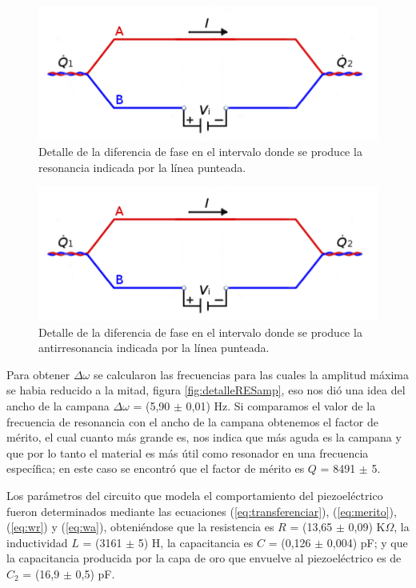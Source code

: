 \documentclass[twoside,twocolumn,a4paper]{article}
\begin{document}
\begin{figure}[H]
\includegraphics[width=\linewidth]{peltier.jpg}
\caption{Detalle de la diferencia de fase en el intervalo donde se produce la resonancia indicada por la l\'inea punteada.}
\label{fig:bajada}
\end{figure}

\begin{figure}[H]
\includegraphics[width=\linewidth]{peltier.jpg}
\caption{Detalle de la diferencia de fase en el intervalo donde se produce la antirresonancia indicada por la l\'inea punteada.}
\label{fig:subida}
\end{figure}

Para obtener $\Delta \omega$ se calcularon las frecuencias para las cuales la amplitud m\'axima se habia reducido a la mitad, figura \ref{fig:detalleRESamp}, eso nos di\'o una idea del ancho de la campana $\Delta \omega$ = (5,90 $\pm$ 0,01) Hz. Si comparamos el valor de la frecuencia de resonancia con el ancho de la campana obtenemos el factor de m\'erito, el cual cuanto m\'as grande es, nos indica que m\'as aguda es la campana y que por lo tanto el material es m\'as \'util como resonador en una frecuencia espec\'ifica; en este caso se encontr\'o que el factor de m\'erito es $Q$ = 8491 $\pm$ 5.

Los par\'ametros del circuito que modela el comportamiento del piezoel\'ectrico fueron determinados mediante las ecuaciones (\ref{eq:transferenciar}), (\ref{eq:merito}), (\ref{eq:wr}) y (\ref{eq:wa}), obteni\'endose que la resistencia es $R$ = (13,65 $\pm$ 0,09) K$\Omega$, la inductividad $L$ = (3161 $\pm$ 5) H, la capacitancia es $C$ = (0,126 $\pm$ 0,004) pF; y que la capacitancia producida por la capa de oro que envuelve al piezoel\'ectrico es de $C_{2}$ = (16,9 $\pm$ 0,5) pF.
\end{document}
